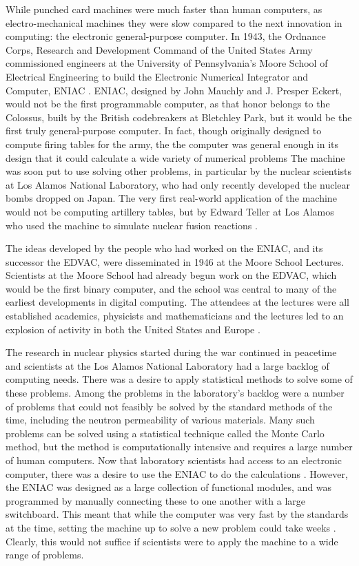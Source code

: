 \documentclass[../main.tex]{subfiles}
\begin{document}
While punched card machines were much faster than human computers, as electro-mechanical machines they were slow compared to the next innovation in computing: the electronic general-purpose computer.
In 1943, the Ordnance Corps, Research and Development Command of the United States Army commissioned engineers at the University of Pennsylvania's Moore School of Electrical Engineering
to build the Electronic Numerical Integrator and Computer, ENIAC \cite{sep-computing-history}\cite{reed1952}.
ENIAC, designed by John Mauchly and J. Presper Eckert, would not be the first programmable computer, as that honor belongs to the Colossus,
built by the British codebreakers at Bletchley Park\cite{winegrad1996}, but it would be the first truly general-purpose computer.
In fact, though originally designed to compute firing tables for the army, the the computer was general enough in its design that it could calculate a wide variety of numerical problems \cite{10.2307/2002620}
The machine was soon put to use solving other problems, in particular by the nuclear scientists at Los Alamos National Laboratory, who had only recently developed the nuclear bombs dropped on Japan.
The very first real-world application of the machine would not be computing artillery tables, but by Edward Teller at Los Alamos who used the machine to simulate nuclear fusion reactions \cite{AtomicHeritageFoundation}.

The ideas developed by the people who had worked on the ENIAC, and its successor the EDVAC, were disseminated in 1946 at the Moore School Lectures.
Scientists at the Moore School had already begun work on the EDVAC, which would be the first binary computer,
and the school was central to many of the earliest developments in digital computing.
The attendees at the lectures were all established academics, physicists and mathematicians and the lectures led to an explosion of activity in both the United States and Europe \cite{Davis2008}.

The research in nuclear physics started during the war continued in peacetime and scientists at the Los Alamos National Laboratory had a large backlog of computing needs.
There was a desire to apply statistical methods to solve some of these problems.
Among the problems in the laboratory's backlog were a number of problems that could not feasibly be solved by the standard methods of the time, including the neutron permeability of various materials.
Many such problems can be solved using a statistical technique called the Monte Carlo method, but the method is computationally intensive and requires a large number of human computers.
Now that laboratory scientists had access to an electronic computer, there was a desire to use the ENIAC to do the calculations \cite{Haigh2014}.
However, the ENIAC was designed as a large collection of functional modules, and was programmed by manually connecting these to one another with a large switchboard.
This meant that while the computer was very fast by the standards at the time, setting the machine up to solve a new problem could take weeks \cite{Rope2007}.
Clearly, this would not suffice if scientists were to apply the machine to a wide range of problems.
\end{document}
